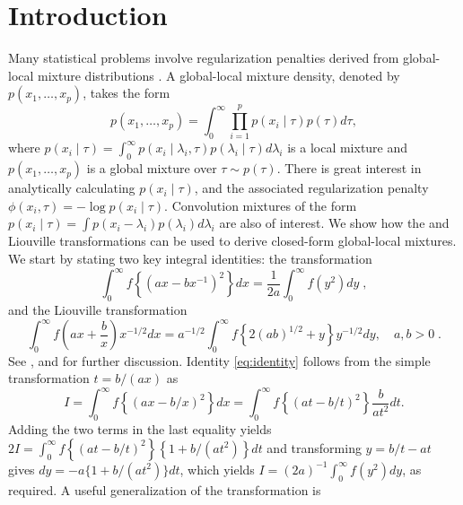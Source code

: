 \documentclass[lineno]{biometrika}
\begin{document}
\section{Introduction}
Many statistical problems involve regularization penalties derived from
global-local mixture distributions \citep{polson_data_2011,
hans2011comment,bhadra2015horseshoe+}. A global-local mixture density, denoted
by $p(x_1, \ldots, x_p)$, takes the form 
\begin{equation*}
  p(x_1, \ldots, x_p) = \int_{0}^{\infty}\prod_{i=1}^{p} p(x_i \mid \tau) 
  p(\tau) d\tau, 
\end{equation*}
where $p(x_i \mid \tau) = \int_{0}^{\infty} p(x_i \mid \lambda_i, \tau) p(\lambda_i \mid \tau) d\lambda_i$ is a local mixture and $p(x_1, \ldots, x_p)$ is a global mixture over $\tau \sim p(\tau)$. There is great interest in analytically calculating $p(x_i \mid \tau)$, and the associated regularization penalty $\phi(x_i, \tau) = -\log p(x_i \mid \tau)$.  Convolution mixtures of the form $p(x_i \mid \tau) = \int p(x_i - \lambda_i) p(\lambda_i) d \lambda_i$ are also of interest. We show how the \CS{} and Liouville transformations can
be used to derive closed-form global-local mixtures.  We start by stating two key integral identities: 
the \CS{} transformation 
\begin{equation}
  \int_0^\infty f \left\{ ( a x - b x^{-1} )^2 \right\} d x 
  = \frac{1}{2a} \int_0^\infty f(y^2) d y
  \;, 
  \label{eq:identity}
\end{equation}
and the Liouville transformation
\begin{equation}
  \int_{0}^{\infty} f\left(ax + \frac{b}{x} \right) x^{-1/2}dx = a^{-1/2} \int_{0}^{\infty} f\left\{ 2 (ab)^{1/2} + y \right\} y^{-1/2} dy, \quad a, b >0
  \;. 
  \label{eq:liouville}
\end{equation}
See \citet{boros2006irresistible}, \citet{baker2008probabilistic} and \citet{jones_generating_2014} for further discussion. Identity \eqref{eq:identity} follows from the simple transformation $t = b/(a x)$ as
\begin{equation*}
  I = \int_{0}^{\infty} f \left\{(ax - b/x)^2 \right\} dx = \int_{0}^{\infty} f \left\{(at - b/t)^2 \right\} \frac{b}{a t^2} dt.
\end{equation*}
Adding the two terms in the last equality yields $2 I = \int_{0}^{\infty} f \left\{(at - b/t)^2 \right\} \left\{ 1+{b}/({a t^2}) \right\} dt$ and transforming $y = b/t - at$ gives $dy = -a \{1+{b}/({a t^2})\} dt$, which yields $I = (2a)^{-1} \int_{0}^{\infty} f(y^2) dy$, as required. A useful generalization of the \CS{} transformation is
\end{document}
